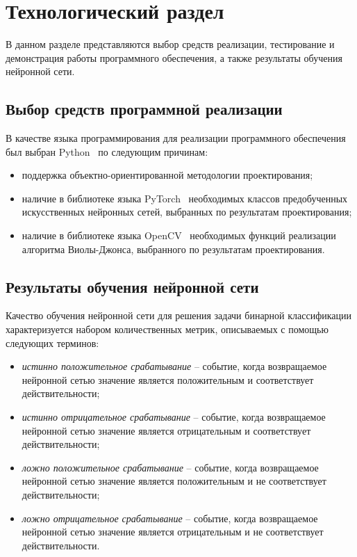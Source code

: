 \chapter{Технологический раздел}

В данном разделе представляются выбор средств реализации, тестирование и демонстрация работы программного обеспечения, а также результаты обучения нейронной сети.

\section{Выбор средств программной реализации}

В качестве языка программирования для реализации программного обеспечения был выбран Python~\cite{python} по следующим причинам:
\begin{itemize}
	\item поддержка объектно-ориентированной методологии проектирования;
	\item наличие в библиотеке языка PyTorch~\cite{pytorch} необходимых классов предобученных искусственных нейронных сетей, выбранных по результатам проектирования;
	\item наличие в библиотеке языка OpenCV~\cite{opencv} необходимых функций реализации алгоритма Виолы-Джонса, выбранного по результатам проектирования.
\end{itemize}

\section{Результаты обучения нейронной сети}

Качество обучения нейронной сети для решения задачи бинарной классификации характеризуется набором количественных метрик, описываемых с помощью следующих терминов:
\begin{itemize}
	\item \textit{истинно положительное срабатывание} -- событие, когда возвращаемое нейронной сетью значение является положительным и соответствует действительности;
	\item \textit{истинно отрицательное срабатывание} -- событие, когда возвращаемое нейронной сетью значение является отрицательным и соответствует действительности;  
	\item \textit{ложно положительное срабатывание} -- событие, когда возвращаемое нейронной сетью значение является положительным и не соответствует действительности; 
	\item \textit{ложно отрицательное срабатывание} -- событие, когда возвращаемое нейронной сетью значение является отрицательным и не соответствует действительности.
\end{itemize}

